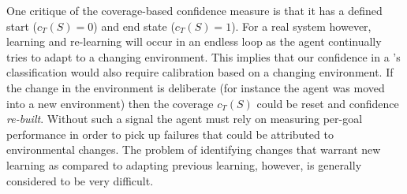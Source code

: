 One critique of the coverage-based confidence measure is that it has a
defined start ($c_T(S)=0$) and end state ($c_T(S)=1$). For a real
system however, learning and re-learning will occur in an endless loop
as the agent continually tries to adapt to a changing
environment. This implies that our confidence in a \dt's
classification would also require calibration based on a changing
environment. If the change in the environment is deliberate (for
instance the agent was moved into a new environment) then the coverage
$c_T(S)$ could be reset and confidence \textit{re-built}. Without such
a signal the agent must rely on measuring per-goal performance in
order to pick up failures that could be attributed to environmental
changes. The problem of identifying changes that warrant new learning
as compared to adapting previous learning, however, is generally
considered to be very difficult.

